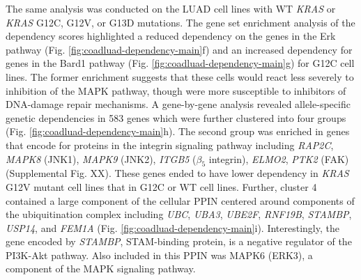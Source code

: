 \documentclass[english, 12pt, letterpaper]{article}
\newcommand{\KRAS}{\emph{KRAS}}
\begin{document}
The same analysis was conducted on the LUAD cell lines with WT \KRAS{} or \KRAS{} G12C, G12V, or G13D mutations.
The gene set enrichment analysis of the dependency scores highlighted a reduced dependency on the genes in the Erk pathway (Fig. \ref{fig:coadluad-dependency-main}f) and an increased dependency for genes in the Bard1 pathway (Fig. \ref{fig:coadluad-dependency-main}g) for G12C cell lines.
The former enrichment suggests that these cells would react less severely to inhibition of the MAPK pathway, though were more susceptible to inhibitors of DNA-damage repair mechanisms.
A gene-by-gene analysis revealed allele-specific genetic dependencies in 583 genes which were further clustered into four groups (Fig. \ref{fig:coadluad-dependency-main}h).
The second group was enriched in genes that encode for proteins in the integrin signaling pathway including \emph{RAP2C}, \emph{MAPK8} (JNK1), \emph{MAPK9} (JNK2), \emph{ITGB5} ($\beta_5$ integrin), \emph{ELMO2}, \emph{PTK2} (FAK) (Supplemental Fig. XX). %
These genes ended to have lower dependency in \KRAS{} G12V mutant cell lines that in G12C or WT cell lines.
Further, cluster 4 contained a large component of the cellular PPIN centered around components of the ubiquitination complex including \emph{UBC}, \emph{UBA3}, \emph{UBE2F}, \emph{RNF19B}, \emph{STAMBP}, \emph{USP14}, and \emph{FEM1A} (Fig. \ref{fig:coadluad-dependency-main}i).
Interestingly, the gene encoded by \emph{STAMBP}, STAM-binding protein, is a negative regulator of the PI3K-Akt pathway.
Also included in this PPIN was MAPK6 (ERK3), a component of the MAPK signaling pathway. 
\end{document}
